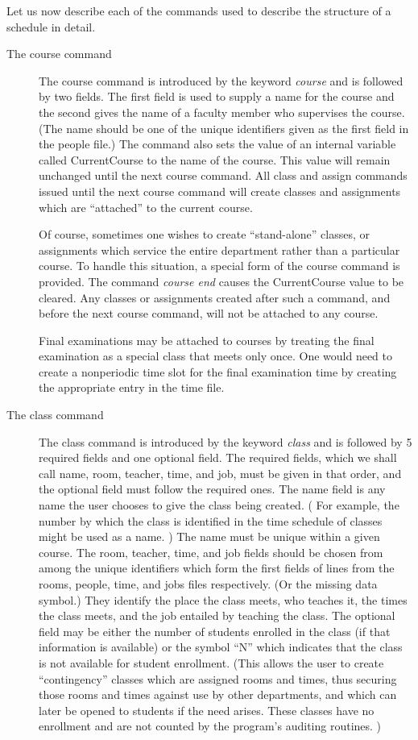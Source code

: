 Let us now describe each of the commands used to describe the structure of 
a schedule in detail.
\begin{description}
\item[The course command] The course command is introduced by the keyword
{\it course} and is followed by two fields. The first field is used to
supply a name for the course and the second gives the name of a
faculty member who supervises the course. (The name should be one of the
unique identifiers given as the first field in the people file.) The command
also sets the value of an internal variable called CurrentCourse to the name
of the course. This value will remain unchanged until the next course
command. All class and assign commands issued until the next course command
will create classes and assignments which are ``attached'' to the current
course. 

Of course, sometimes one wishes to create ``stand-alone'' classes, or
assignments which service the entire department rather than a particular
course. To handle this situation, a special form of the course command
is provided. The command {\it course end} causes the CurrentCourse value
to be cleared. Any classes or assignments created after such a command, and
before the next course command, will not be attached to any course.

Final examinations may be attached to courses by treating the final examination
as a special class that meets only once. One would need to create a
nonperiodic time slot for the final examination time by creating the appropriate entry in the time file. 

\item[The class command] The class command is introduced by the keyword
{\it class} and is followed by 5 required fields and one optional field.
The required fields, which we shall call name, room, teacher, time, and job,
must be given in that order, and the optional field must follow the 
required ones. The name field is any name the user chooses to give the
class being created. ( For example, the number by which the class is
identified in the time schedule of classes might be used as a name. ) The 
name must be unique within a given course. The room, teacher, time, and
job fields should be chosen from among the unique identifiers which form
the first fields of lines from the rooms, people, time, and jobs files
respectively. (Or the missing data symbol.) They identify the place the
class meets, who teaches it, the times the class meets, and the job entailed
by teaching the class. The optional field may be either the number of students
enrolled in the class (if that information is available) or the symbol ``N''
which indicates that the class is not available for student enrollment. 
(This allows the user to create ``contingency'' classes which are assigned
rooms and times, thus securing those rooms and times against use by other
departments, and which can later be opened to students if the need arises. These classes have no enrollment and are not counted by the program's
auditing routines. ) 


\end{description}
